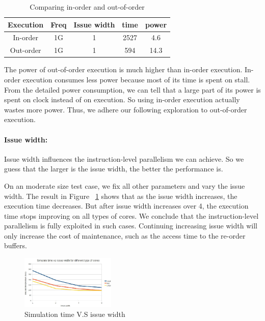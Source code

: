 \documentclass[twocolumn,letterpaper,10pt]{article}
\begin{document}
\begin{table}[ht!]
\begin{center}
\begin{tabular}{ccccc}
\toprule
Execution   &  Freq  & Issue width  &  time  & power \\
\midrule
In-order   &  1G  &  1  &  2527  &  4.6 \\
Out-order     &  1G &  1  &    594 & 14.3 \\
\bottomrule
\end{tabular}
\end{center}
\caption{Comparing in-order and out-of-order}
\end{table}

The power of out-of-order execution is much higher than in-order execution. In-order execution
consumes less power because most of its time is spent on stall. From
the detailed power consumption, we can tell that a
large part of its power is spent on clock instead of on execution. So using in-order execution
actually wastes more power. Thus, we adhere our following exploration to out-of-order execution.

\paragraph{Issue width:} Issue width influences the instruction-level
parallelism we can achieve. So we guess that the larger is the issue width,
the better the performance is.

On an moderate size test case, we fix all other parameters and vary the issue
width. The result in Figure ~\ref{fig:issue} shows that as the issue width
increases, the execution time decreases. But after issue width
increases over 4, the execution time stops improving on all types of cores. We conclude that the
instruction-level parallelism is fully exploited in such cases. Continuing
increasing issue width will only increase the cost of maintenance, such as the access time to the re-order buffers.

\begin{figure}[ht!]
\begin{center}
\includegraphics[width=0.4\textwidth]{figures/issue.jpg}
\end{center}
\label{fig:issue}
\caption{Simulation time V.S issue width}
\end{figure}
\end{document}
